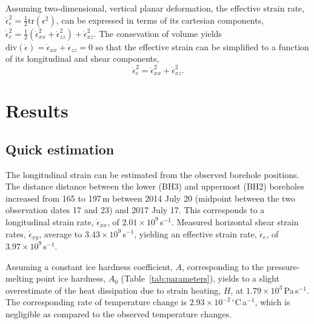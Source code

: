 \documentclass[utf8]{article}
\begin{document}
    Assuming two-dimensional, vertical planar deformation, the effective strain
    rate, $\dot\epsilon_e^2 = \frac{1}{2}\mathrm{tr}(\epsilon^2)$, can be
    expressed in terms of its cartesian components, $\dot\epsilon_e^2 =
    \frac{1}{2}(\dot\epsilon_{xx}^2 + \dot\epsilon_{zz}^2) +
    \dot\epsilon_{xz}^2$. The consevation of volume yields
    $\mathrm{div}(\dot\epsilon) = \dot\epsilon_{xx} + \dot\epsilon_{zz} = 0$ so
    that the effective strain can be simplified to a function of its
    longitudinal and shear components,
    \begin{equation}
        \dot\epsilon_e^2 = \dot\epsilon_{xx}^2 + \dot\epsilon_{xz}^2.
    \end{equation}


\section{Results}

\subsection{Quick estimation}

    The longitudinal strain can be estimated from the observed borehole
    positions. The distance distance between the lower (BH3) and uppermost
    (BH2) boreholes increased from 165 to 197\,m between 2014 July 20 (midpoint
    between the two observation dates 17 and 23) and 2017 July 17. This
    corresponds to a longitudinal strain rate, $\dot\epsilon_{xx}$, of
    $2.01\times10^9$\,s$^{-1}$. Measured horizontal shear strain rates,
    $\dot\epsilon_{xy}$, average to $3.43\times10^9$\,s$^{-1}$, yielding
    an effective strain rate, $\dot\epsilon_e$, of $3.97\times10^9$\,s$^{-1}$.

    Assuming a constant ice hardness coefficient, $A$, corresponding to the
    pressure-melting point ice hardness, $A_0$ (Table~\ref{tab:parameters}),
    yields to a slight overestimate of the heat dissipation due to strain
    heating, $H$, at $1.79\times10^3$\,Pa\,s$^{-1}$. The corresponding
    rate of temperature change is $2.93\times10^{-2}$\,$^{\circ}$C\,a$^{-1}$,
    which is negligible as compared to the observed temperature changes.
\end{document}
